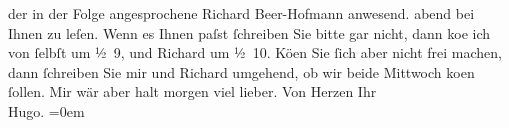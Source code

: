 \begin{ledgroupsized}[t]{13cm}
{{{                  der in der Folge angesprochene Richard
                     Beer-Hofmann anwesend.}}}\label{K_L00881-1h}{ }abend bei Ihnen zu leſen. Wenn es Ihnen paſst ſchreiben Sie bitte gar
               nicht, dann ko{\geminationm}e ich von ſelbſt um ½ 9, und
                  Richard um ½ 10. Kö{\geminationn}en Sie ſich aber nicht frei machen, dann ſchreiben Sie
               mir und Richard umgehend, ob wir beide
                  Mittwoch ko{\geminationm}en ſollen. Mir wär aber halt
               morgen viel lieber.\pend
           \pstart
           Von Herzen Ihr{\\[\baselineskip]}\spacefill\mbox{Hugo.}\pend
           \leftskip=0em{}
         
         \endnumbering{}\end{ledgroupsized}  \newcommand{\dateiname}{L00881}\newcommand{\titel}{Hugo von Hofmannsthal an Arthur Schnitzler, [16. 1. 1899]}\newcommand{\editorInnen}{Martin Anton Müller und Gerd-Hermann Susen}
      
